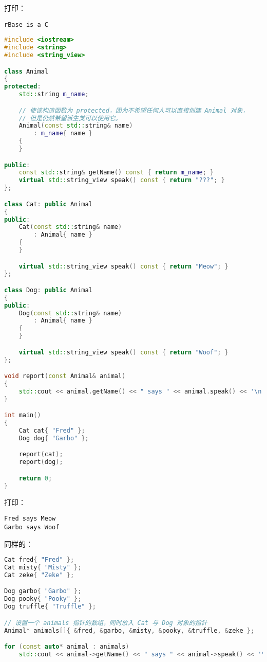\documentclass[../../LearnCpp.tex]{subfiles}
\begin{document}
打印：

\begin{lstlisting}
rBase is a C
\end{lstlisting}

\begin{lstlisting}[language=C++]
#include <iostream>
#include <string>
#include <string_view>

class Animal
{
protected:
    std::string m_name;

    // 使该构造函数为 protected，因为不希望任何人可以直接创建 Animal 对象，
    // 但是仍然希望派生类可以使用它。
    Animal(const std::string& name)
        : m_name{ name }
    {
    }

public:
    const std::string& getName() const { return m_name; }
    virtual std::string_view speak() const { return "???"; }
};

class Cat: public Animal
{
public:
    Cat(const std::string& name)
        : Animal{ name }
    {
    }

    virtual std::string_view speak() const { return "Meow"; }
};

class Dog: public Animal
{
public:
    Dog(const std::string& name)
        : Animal{ name }
    {
    }

    virtual std::string_view speak() const { return "Woof"; }
};

void report(const Animal& animal)
{
    std::cout << animal.getName() << " says " << animal.speak() << '\n';
}

int main()
{
    Cat cat{ "Fred" };
    Dog dog{ "Garbo" };

    report(cat);
    report(dog);

    return 0;
}
\end{lstlisting}

打印：

\begin{lstlisting}
Fred says Meow
Garbo says Woof
\end{lstlisting}

同样的：

\begin{lstlisting}[language=C++]
Cat fred{ "Fred" };
Cat misty{ "Misty" };
Cat zeke{ "Zeke" };

Dog garbo{ "Garbo" };
Dog pooky{ "Pooky" };
Dog truffle{ "Truffle" };

// 设置一个 animals 指针的数组，同时放入 Cat 与 Dog 对象的指针
Animal* animals[]{ &fred, &garbo, &misty, &pooky, &truffle, &zeke };

for (const auto* animal : animals)
    std::cout << animal->getName() << " says " << animal->speak() << '\n';
\end{lstlisting}
\end{document}
